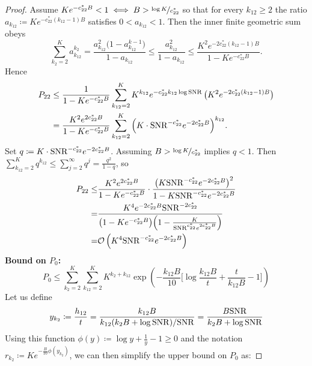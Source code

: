 \documentclass[numsec,webpdf,modern,medium,namedate]{oup-authoring-template}
\theoremstyle{thmstyleone}%
\theoremstyle{thmstyletwo}%
\theoremstyle{thmstylethree}%
\begin{document}
\begin{proof}
Assume $Ke^{-c^\ast_{22}B}<1 \iff B > \nicefrac{\log K}{c^\ast_{22}}$ so that for every \(k_{12}\ge2\) the ratio $a_{k_{12}}\coloneqq Ke^{-c^\ast_{22} (k_{12}-1)B}$ satisfies $0<a_{k_{12}}<1$. Then the inner finite geometric sum obeys
$$
\sum_{k_2=2}^K a_{k_{12}}^{k_2}
= \frac{a_{k_{12}}^{2}\bigl(1-a_{k_{12}}^{k-1}\bigr)}{1-a_{k_{12}}}
\leq \frac{a_{k_{12}}^{2}}{1-a_{k_{12}}}
\leq \frac{K^2 e^{-2c^\ast_{22} (k_{12}-1)B}}{1- K e^{-c^\ast_{22}B}}.
$$
Hence
$$
\begin{aligned}
P_{22}
&\le \frac{1}{1- Ke^{-c^\ast_{22}B}}
\sum_{k_{12}=2}^K
K^{k_{12}} e^{-c^\ast_{22} k_{12}\log\mathrm{SNR}}\, \big(K^2 e^{-2c^\ast_{22} (k_{12}-1)B}\big)\\
&= \frac{K^2 e^{2c^\ast_{22}B}}{1- K e^{-c^\ast_{22}B}}
\sum_{k_{12}=2}^K
\Big(K\cdot\mathrm{SNR}^{-c^\ast_{22}} e^{-2c^\ast_{22}B}\Big)^{k_{12}}.
\end{aligned}
$$
Set $q\coloneqq K\cdot\mathrm{SNR}^{-c^\ast_{22}} e^{-2c^\ast_{22}B}$. Assuming {$B > \nicefrac{\log K}{c_{22}^\ast}$} implies $q< 1$.
Then $\sum_{k_{12}=2}^K q^{k_{12}} \leq\sum_{j=2}^{\infty} q^{j}
= \frac{q^2}{1-q}$, so
\begin{equation*}
    \begin{split}
        P_{22} \leq & 
\frac{K^2 e^{2c^\ast_{22}B}}{1- K e^{-c^\ast_{22}B}}\cdot
\frac{\big(K\mathrm{SNR}^{-c^\ast_{22}} e^{-2c^\ast_{22}B}\big)^{2}}{1- K\mathrm{SNR}^{-c^\ast_{22}} e^{-2c^\ast_{22}B}}\\
= & 
\frac{K^{4}e^{-2c^\ast_{22}B}\mathrm{SNR}^{-2c^\ast_{22}}}
{\bigl(1 - K e^{-c^\ast_{22}B}\bigr)\Bigl(1 - \tfrac{K}{\mathrm{SNR}^{c^\ast_{22}}e^{2c^\ast_{22}B}}\Bigr)}\\
= &  \mathcal{O}\left(K^4 \mathrm{SNR} ^{-c^\ast_{22}}e^{-2c^\ast_{22}B}\right)
    \end{split}
\end{equation*}
\textbf{Bound on $P_0$:}
$$
P_0 \leq \sum_{k_2=2}^{K}\sum_{k_{12}=2}^{K}
K^{k_2+k_{12}}
\exp\left(
-\frac{k_{12}B}{10}\Big[\log\frac{k_{12}B}{t}+\frac{t}{k_{12}B}-1\Big]
\right)
$$
Let us define 
$$
y_{k_2}\coloneqq \frac{h_{12}}{t} = \frac{k_{12}B}{k_{12}(k_2B+\log\mathrm{SNR})/\mathrm{SNR}}
=\frac{B\mathrm{SNR}}{k_2B+\log\mathrm{SNR}}
$$
Using this function $\phi(y) \coloneqq \log y+\frac{1}{y}-1\ge 0$ and the notation $r_{k_2} \coloneqq Ke^{-\frac{B}{10}\phi(y_{k_2})}$, we can then simplify the upper bound on $P_0$ as:

\end{proof}
\end{document}
